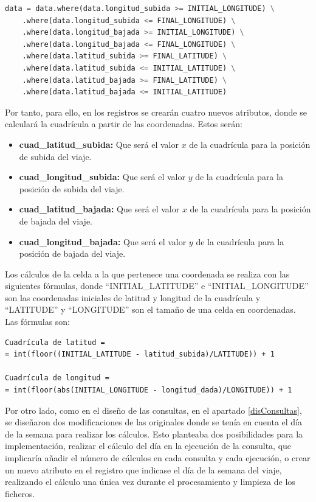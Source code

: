 \begin{lstlisting}[label=filtroLim,language=python,frame=single,caption=Filtro de coordenadas para los registros que sobrepasan el límite]
data = data.where(data.longitud_subida >= INITIAL_LONGITUDE) \
    .where(data.longitud_subida <= FINAL_LONGITUDE) \
    .where(data.longitud_bajada >= INITIAL_LONGITUDE) \
    .where(data.longitud_bajada <= FINAL_LONGITUDE) \
    .where(data.latitud_subida >= FINAL_LATITUDE) \
    .where(data.latitud_subida <= INITIAL_LATITUDE) \
    .where(data.latitud_bajada >= FINAL_LATITUDE) \
    .where(data.latitud_bajada <= INITIAL_LATITUDE)
\end{lstlisting}

Por tanto, para ello, en los registros se crearán cuatro nuevos atributos, donde se calculará la cuadrícula a partir de las coordenadas. Estos serán:

\begin{itemize}
\item \textbf{cuad\_latitud\_subida:} Que será el valor $x$ de la cuadrícula para la posición de subida del viaje.
\item \textbf{cuad\_longitud\_subida:} Que será el valor $y$ de la cuadrícula para la posición de subida del viaje.
\item \textbf{cuad\_latitud\_bajada:} Que será el valor $x$ de la cuadrícula para la posición de bajada del viaje.
\item \textbf{cuad\_longitud\_bajada:} Que será el valor $y$ de la cuadrícula para la posición de bajada del viaje.
\end{itemize}

Los cálculos de la celda a la que pertenece una coordenada se realiza con las siguientes fórmulas, donde ``INITIAL\_LATITUDE'' e ``INITIAL\_LONGITUDE'' son las coordenadas iniciales de latitud y longitud de la cuadrícula y ``LATITUDE'' y ``LONGITUDE'' son el tamaño de una celda en coordenadas. Las fórmulas son:

\begin{verbatim}
Cuadrícula de latitud =
= int(floor((INITIAL_LATITUDE - latitud_subida)/LATITUDE)) + 1 

Cuadrícula de longitud = 
= int(floor(abs(INITIAL_LONGITUDE - longitud_dada)/LONGITUDE)) + 1
\end{verbatim}

Por otro lado, como en el diseño de las consultas, en el apartado \ref{disConsultas}, se diseñaron dos modificaciones de las originales donde se tenía en cuenta el día de la semana para realizar los cálculos. Esto planteaba dos posibilidades para la implementación, realizar el cálculo del día en la ejecución de la consulta, que implicaría añadir el número de cálculos en cada consulta y cada ejecución, o crear un nuevo atributo en el registro que indicase el día de la semana del viaje, realizando el cálculo una única vez durante el procesamiento y limpieza de los ficheros.

